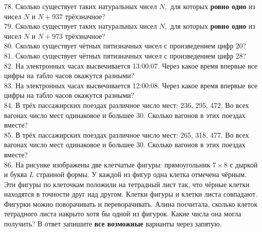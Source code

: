 \documentclass[12pt]{article}
\begin{document}
78. Сколько существует таких натуральных чисел $N,$ для которых {\bf ровно одно} из чисел $N$ и $N+937$ трёхзначное?\\
79. Сколько существует таких натуральных чисел $N,$ для которых {\bf ровно одно} из чисел $N$ и $N+973$ трёхзначное?\\
80. Сколько существует чётных пятизначных чисел с произведением цифр 20?\\
81. Сколько существует чётных пятизначных чисел с произведением цифр 28?\\
82. На электронных часах высвечивается 13:00:07. Через какое время впервые все цифры на табло часов окажутся разными?\\
83. На электронных часах высвечивается 12:00:08. Через какое время впервые все цифры на табло часов окажутся разными?\\
84. В трёх пассажирских поездах различное число мест: 236, 295, 472. Во всех вагонах число мест одинаковое и большее 30. Сколько вагонов в этих поездах вместе?\\
85. В трёх пассажирских поездах различное число мест: 265, 318, 477. Во всех вагонах число мест одинаковое и большее 30. Сколько вагонов в этих поездах вместе?\\
86. На рисунке изображены две клетчатые фигуры: прямоугольник $7\times8$ с дыркой и буква $L$ странной формы. У каждой из фигур одна клетка отмечена чёрным. Эти фигуры по клеточкам положили на тетрадный лист так, что чёрные клетки находятся в точности друг над другом. Клетки фигуры и клетки листа совпадают. Фигурки можно поворачивать и переворачивать. Алина посчитала, сколько клеток тетрадного листа накрыто хотя бы одной из фигурок. Какие числа она могла получить? В ответ запишите {\bf все возможные} варианты через запятую.
\begin{center}
\begin{figure}[ht!]
\end{figure}
\end{center}
\end{document}
